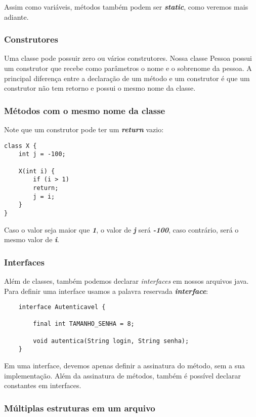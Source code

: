 \documentclass[12pt]{article}
\begin{document}
Assim como variáveis, métodos também podem ser \textbf{\textit{static}}, como veremos mais adiante.

\subsubsection{Construtores}

Uma classe pode possuir zero ou vários construtores. Nossa classe Pessoa possui um construtor que recebe como parâmetros o nome e o sobrenome da pessoa. A principal diferença entre a declaração de um método e um construtor é que um construtor não tem retorno e possui o mesmo nome da classe.

\subsubsection{Métodos com o mesmo nome da classe}

Note que um construtor pode ter um \textbf{\textit{return}} vazio:

\begin{lstlisting}
class X {
	int j = -100;
	
	X(int i) {
		if (i > 1)
		return;
		j = i;
	}
}
\end{lstlisting}

Caso o valor seja maior que \textbf{\textit{1}}, o valor de \textbf{\textit{j}} será \textbf{\textit{-100}}, caso contrário, será o mesmo valor de \textbf{\textit{i}}.

\subsubsection{Interfaces}

Além de classes, também podemos declarar \textit{interfaces} em nossos arquivos java. Para definir uma interface usamos a palavra reservada \textbf{\textit{interface}}:

\begin{lstlisting}
	interface Autenticavel {
		
		final int TAMANHO_SENHA = 8;
		
		void autentica(String login, String senha);
	}
\end{lstlisting}

Em uma interface, devemos apenas definir a assinatura do método, sem a sua implementação. Além da assinatura de métodos, também é possível declarar constantes em interfaces.

\subsubsection{Múltiplas estruturas em um arquivo}
\end{document}
